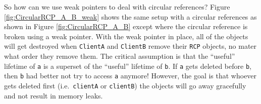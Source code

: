 \documentclass[pdf,ps2pdf,11pt]{SANDreport}
\begin{document}
So how can we use weak pointers to deal with circular references?
Figure {}\ref{fig:CircularRCP_A_B_weak} shows the same setup with a
circular references as shown in Figure {}\ref{fig:CircularRCP_A_B}
except where the circular reference is broken using a weak pointer.
With the weak pointer in place, all of the objects will get destroyed
when {}\texttt{ClientA} and {}\texttt{ClientB} remove their
{}\texttt{RCP} objects, no mater what order they remove them.  The
critical assumption is that the ``useful'' lifetime of {}\texttt{a} is
a superset of the ``useful'' lifetime of {}\texttt{b}.  If
{}\texttt{a} gets deleted before {}\texttt{b}, then {}\texttt{b} had
better not try to access {}\texttt{a} anymore!  However, the goal is
that whoever gets deleted first (i.e.\ {}\texttt{clientA} or
{}\texttt{clientB}) the objects will go away gracefully and not result
in memory leaks.
\end{document}
